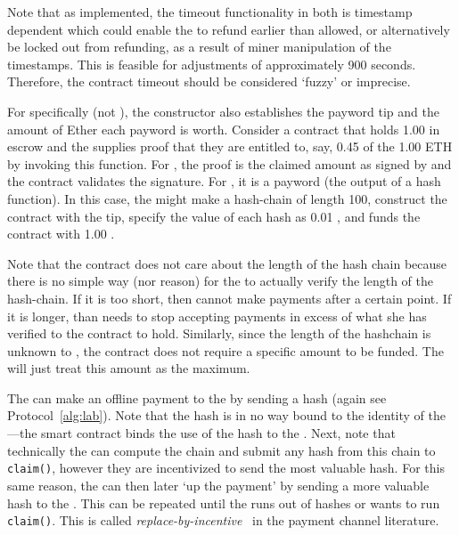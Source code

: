 Note that as implemented, the timeout functionality in both is timestamp dependent which could enable the \make to refund earlier than allowed, or alternatively be locked out from refunding, as a result of miner manipulation of the timestamps. This is feasible for adjustments of approximately 900 seconds. Therefore, the contract timeout should be considered `fuzzy' or imprecise. 

For \ew specifically (not \fifty), the constructor also establishes the payword tip and the amount of Ether each payword is worth. Consider a contract that holds 1.00 \eth in escrow and the \take supplies proof that they are entitled to, say, 0.45 of the 1.00 ETH by invoking this function. For \fifty, the proof is the claimed amount as signed by \make and the contract validates the signature. For \ew, it is a payword (\ie the output of a hash function). In this case, the \make might make a hash-chain of length 100, construct the contract with the tip, specify the value of each hash as 0.01 \eth, and funds the contract with 1.00 \eth. 

Note that the contract does not care about the length of the hash chain because there is no simple way (nor reason) for the \take to actually verify the length of the hash-chain. If it is too short, then \make cannot make payments after a certain point. If it is longer, than \take needs to stop accepting payments in excess of what she has verified to the contract to hold. Similarly, since the length of the hashchain is unknown to \take, the contract does not require a specific amount to be funded. The \take will just treat this amount as the maximum. 


The \make can make an offline payment to the \take by sending a hash (again see Protocol~\ref{alg:lab}). Note that the hash is in no way bound to the identity of the \take---the smart contract binds the use of the hash to the \take. Next, note that technically the \take can compute the chain and submit any hash from this chain to \texttt{claim()}, however they are incentivized to send the most valuable hash. For this same reason, the \make can then later `up the payment' by sending a more valuable hash to the \take. This can be repeated until the \make runs out of hashes or \take wants to run \texttt{claim()}. This is called \textit{replace-by-incentive}~\cite{MMSH16} in the payment channel literature.

